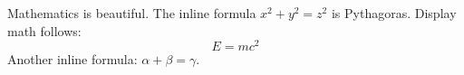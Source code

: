 \documentclass{article}
\begin{document}
Mathematics is beautiful.
The inline formula $x^2 + y^2 = z^2$ is Pythagoras.
Display math follows:
\[E = mc^2\]
Another inline formula: $\alpha + \beta = \gamma$.
\end{document}
